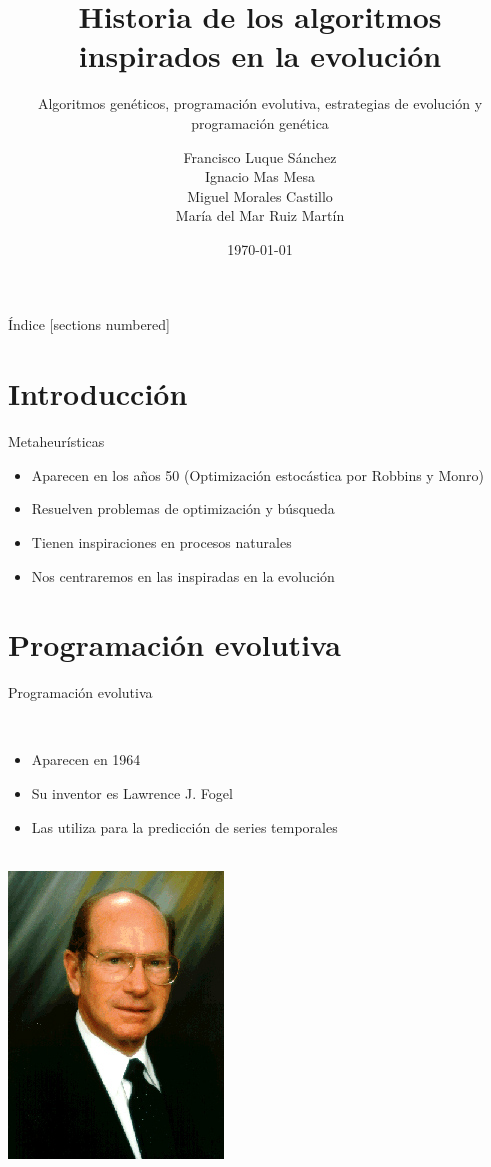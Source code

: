 \documentclass[10pt]{beamer}
\title{Historia de los algoritmos inspirados en la evolución}
\subtitle{Algoritmos genéticos, programación evolutiva, estrategias de evolución y programación genética}
\date{\today}
\author{
  Francisco Luque Sánchez \\
  Ignacio Mas Mesa \\
  Miguel Morales Castillo \\
  María del Mar Ruiz Martín
}
\institute{Universidad de Granada}
\begin{document}
\maketitle

\begin{frame}{Índice}
  [sections numbered]
  \tableofcontents[hideallsubsections]
\end{frame}

\section{Introducción}

\begin{frame}[fragile]{Metaheurísticas}
  \begin{itemize}
  \item Aparecen en los años 50 (Optimización estocástica por Robbins y Monro) \\
  \item Resuelven problemas de optimización y búsqueda \\
  \item Tienen inspiraciones en procesos naturales \\
  \item Nos centraremos en las inspiradas en la evolución
  \end{itemize}
\end{frame}

\section{Programación evolutiva}

\begin{frame}[fragile]{Programación evolutiva}
  \begin{multicols}{2}
    ~\\
    \begin{itemize}
    \item Aparecen en 1964
    \item Su inventor es Lawrence J. Fogel
    \item Las utiliza para la predicción de series temporales
    \end{itemize}
    ~\\
    \includegraphics[scale=.6]{imgs/Fogel}
  \end{multicols}
\end{frame}
\end{document}

